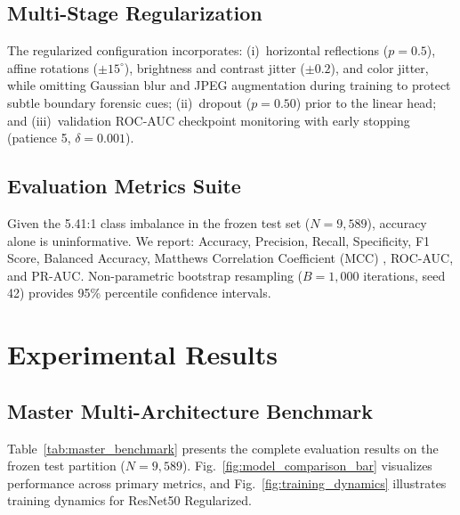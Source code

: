 \documentclass[conference]{IEEEtran}
\begin{document}
\subsection{Multi-Stage Regularization}
The regularized configuration incorporates: (i)~horizontal reflections ($p=0.5$), affine rotations ($\pm 15^\circ$), brightness and contrast jitter ($\pm 0.2$), and color jitter, while omitting Gaussian blur and JPEG augmentation during training to protect subtle boundary forensic cues; (ii)~dropout ($p=0.50$) prior to the linear head; and (iii)~validation ROC-AUC checkpoint monitoring with early stopping (patience 5, $\delta=0.001$).

\subsection{Evaluation Metrics Suite}
Given the 5.41:1 class imbalance in the frozen test set ($N=9,589$), accuracy alone is uninformative. We report: Accuracy, Precision, Recall, Specificity, F1 Score, Balanced Accuracy, Matthews Correlation Coefficient (MCC) \cite{chicco2020advantages}, ROC-AUC, and PR-AUC. Non-parametric bootstrap resampling ($B=1{,}000$ iterations, seed 42) provides 95\% percentile confidence intervals.


\section{Experimental Results}
\label{sec:results}

\subsection{Master Multi-Architecture Benchmark}

Table~\ref{tab:master_benchmark} presents the complete evaluation results on the frozen test partition ($N = 9{,}589$). Fig.~\ref{fig:model_comparison_bar} visualizes performance across primary metrics, and Fig.~\ref{fig:training_dynamics} illustrates training dynamics for ResNet50 Regularized.
\end{document}
